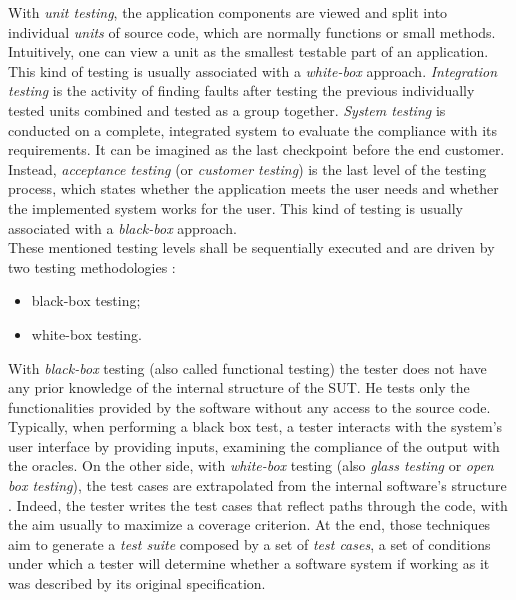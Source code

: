 With \textit{unit testing}, the application components are viewed and split into  individual \textit{units} of source code, which are normally functions or small methods. Intuitively, one can view a unit as the smallest testable part of an application. This kind of testing is usually associated with a \textit{white-box} approach. \textit{Integration testing} is the activity of finding faults after testing the previous individually tested units combined and tested as a group together. \textit{System testing} is conducted on a complete, integrated system to evaluate the compliance with its requirements. It can be imagined as the last checkpoint before the end customer. Instead, \textit{acceptance testing} (or \textit{customer testing}) is the last level of the testing process, which states whether the application meets the user needs and whether the implemented system works for the user. This kind of testing is usually associated with a \textit{black-box} approach. 
\\
These mentioned testing levels shall be sequentially executed and are driven by two testing methodologies \cite{white-box, black-box}: 
\begin{itemize}
\item black-box testing;
\item white-box testing.
\end{itemize} 
With \textit{black-box} testing (also called functional testing) the tester does not have any prior knowledge of the internal structure of the SUT. He tests only the functionalities provided by the software without any access to the source code. Typically, when performing a black box test, a tester interacts with the system's user interface by providing inputs, examining the compliance of the output with the oracles. On the other side, with \textit{white-box} testing (also \textit{glass testing} or \textit{open box testing}), the test cases are extrapolated from the internal software's structure \cite{grano}. Indeed, the tester writes the test cases that reflect paths through the code, with the aim usually to maximize a coverage criterion. 
At the end, those techniques aim to generate a \textit{test suite} composed by a set of \textit{test cases}, \ie a set of conditions under which a tester will determine whether a software system if working as it was described by its original specification.

